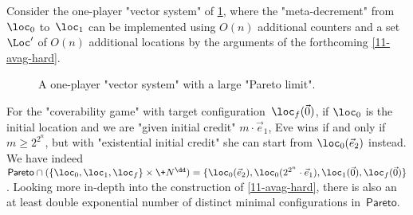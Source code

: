 \begin{example}\label{11-ex-pareto}
  Consider the one-player "vector system" of \cref{11-fig-pareto},
  where the "meta-decrement" from~$\loc_0$ to~$\loc_1$ can be
  implemented using $O(n)$ additional counters and a set~$\Loc'$ of
  $O(n)$ additional locations by the arguments of the
  forthcoming \cref{11-avag-hard}.
  
  \begin{figure}[htbp]
    \centering
  \caption{\label{11-fig-pareto} A one-player "vector system"
  with a large "Pareto limit".}
  \end{figure}
  For the "coverability game" with target
  configuration~$\loc_f(\vec 0)$, if $\loc_0$ is the initial location
  and we are "given initial credit" $m\cdot\vec e_1$, Eve wins if and
  only if $m\geq 2^{2^n}$, but with "existential initial credit" she
  can start from $\loc_0(\vec e_2)$ instead.  We have indeed
  $\mathsf{Pareto}\cap(\{\loc_0,\loc_1,\loc_f\}\times\+N^\dd)=\{\loc_0(\vec
  e_2),\loc_0(2^{2^n}\cdot\vec e_1),\loc_1(\vec 0),\loc_f(\vec 0)\}$.
  Looking more in-depth into the construction of \cref{11-avag-hard},
  there is also an at least double exponential number of distinct
  minimal configurations in~$\mathsf{Pareto}$.
\end{example}



